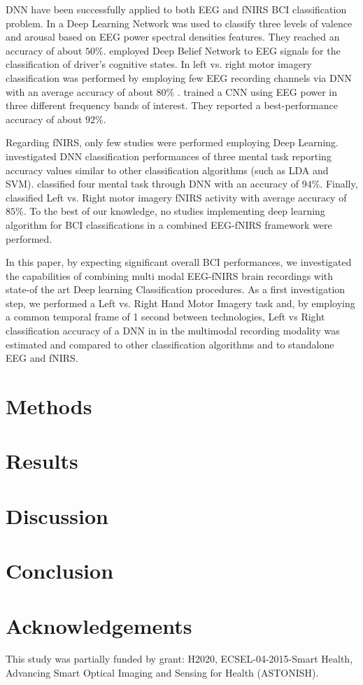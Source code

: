 \documentclass[12pt ]{iopart}
\begin{document}
DNN have been successfully applied to  both EEG and fNIRS BCI classification problem. In \textcite{jirayucharoensak2014eeg} a Deep Learning Network was used to classify three levels of valence and arousal based on EEG power spectral densities  features. They reached an accuracy of about $50\%$. 
\textcite{hajinoroozi2015feature} employed Deep Belief Network to EEG signals for the classification of driver's cognitive states. 
In \textcite{an2014deep} left vs. right motor imagery classification  was performed by employing few EEG recording channels via DNN with an average accuracy of about $80\%$ . 
 \textcite{bashivan2015learning} trained a CNN using EEG power in three different frequency bands of interest. They reported a best-performance accuracy of about $92\%$.

Regarding fNIRS, only  few  studies were performed employing Deep Learning.  \textcite{hennrich2015investigating} investigated DNN classification performances of three mental task reporting accuracy values similar  to other classification algorithms (such as LDA and SVM).  \textcite{abibullaev2011neural} classified four mental task through DNN with an accuracy of $94\%$. Finally, \textcite{nguyen2013temporal} classified Left vs. Right motor imagery fNIRS activity with average accuracy of $85\%$. To the best of our knowledge, no studies implementing deep learning algorithm for BCI classifications  in a combined EEG-fNIRS framework were performed.

 In this paper, by expecting significant overall BCI performances,  we investigated the capabilities of combining multi modal EEG-fNIRS brain recordings  with state-of the art Deep learning Classification procedures. As a first investigation step, we performed a Left vs. Right Hand Motor Imagery task \parencite{pfurtscheller2001motor} and, by employing a common temporal frame of 1 second between technologies, Left vs Right classification accuracy of a DNN in in the multimodal recording modality was estimated and compared to other classification algorithms and to standalone EEG and fNIRS. 

\section{Methods}

\section{Results}

\section{Discussion}

\section{Conclusion}

\section{Acknowledgements}
This study was partially funded by grant: H2020, ECSEL-04-2015-Smart Health, Advancing Smart Optical Imaging and Sensing for Health (ASTONISH).
 

\newpage
\printbibliography
 \cleardoublepage
{}
\end{document}
